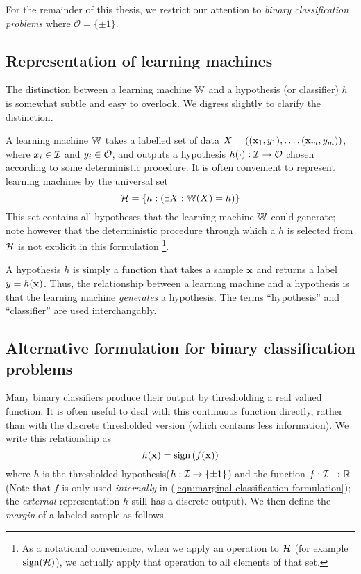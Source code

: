 For the remainder of this thesis, we restrict our attention to
\emph{binary classification problems} where $\mathcal{O} = \{\pm
1\}$.


\subsection{Representation of learning machines}
\label{sec:representation learning machines}

The distinction between a learning machine $\mathbb{W}$ and a hypothesis (or
classifier) $h$ is somewhat subtle and easy to overlook.  We digress
slightly to clarify the distinction.

A learning machine $\mathbb{W}$ takes a labelled set of data $X =
((\mathbf{x}_1, y_1), \ldots, (\mathbf{x}_m, y_m))$, where $x_i \in \mathcal{I}$ and
$y_i \in \mathcal{O}$, and outputs a hypothesis $h(\cdot) : \mathcal{I} \rightarrow
\mathcal{O}$ chosen according to some deterministic procedure.  It is often
convenient to represent learning machines by the universal set
%
\begin{equation}
\mathcal{H} = \{h : \left( \exists X : \mathbb{W}(X) = h \right) \}
\end{equation}
%
This set contains all hypotheses that the learning machine $\mathbb{W}$ could
generate; note however that the deterministic procedure through which
a $h$ is selected from $\mathcal{H}$ is not explicit in this formulation%
\footnote{As a notational convenience, when we apply an operation to $\mathcal{H}$
(for example $\mathrm{sign}(\mathcal{H})$), we actually apply that operation to all
elements of that set.}.

A hypothesis $h$ is simply a function that takes a sample $\mathbf{x}$
and returns a label $y = h(\mathbf{x})$.  Thus, the relationship between a
learning machine and a hypothesis is that the learning machine
\emph{generates} a hypothesis.  The terms ``hypothesis'' and
``classifier'' are used interchangably.


\subsection{Alternative formulation for binary classification problems}
\label{sec:margin formulation}

Many binary classifiers produce their output by thresholding a real
valued function.  It is often useful to deal with this continuous
function directly, rather than with the discrete thresholded version
(which contains less information).  We write this relationship as  
%
\begin{equation}
h(\mathbf{x}) = \mathrm{sign} \left( f(\mathbf{x}) \right)
\label{eqn:marginal classification formulation}
\end{equation}
%
where $h$ is the thresholded hypothesis($h : \mathcal{I} \rightarrow \{\pm
1\}$) and the function $f : \mathcal{I} \rightarrow \mathbb{R}$.  (Note that
$f$ is only used \emph{internally} in (\ref{eqn:marginal
classification formulation}); the \emph{external} representation $h$
still has a discrete output).  We then define the \emph{margin} of a
labeled sample as follows. 

